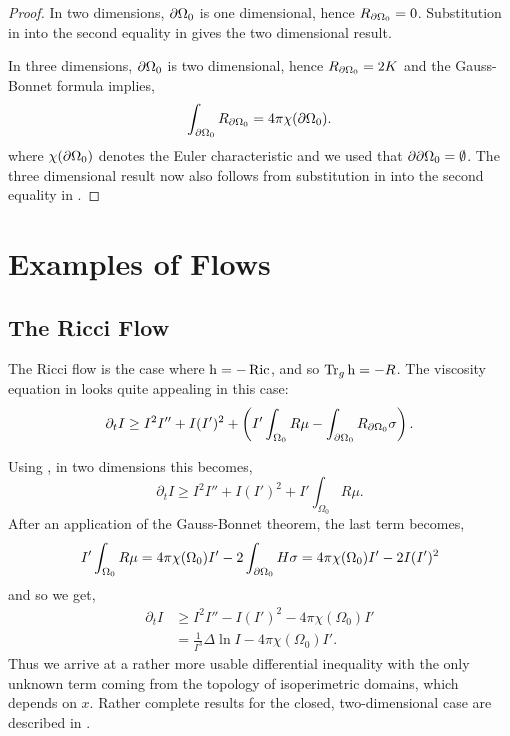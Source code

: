 \documentclass{amsart}
\begin{document}
\begin{proof}
In two dimensions, \(\partial {\Omega_0}\) is one dimensional, hence \(R_{\partial {\Omega_0}} = 0\). Substitution in into the second equality in  gives the two dimensional result.

In three dimensions, \(\partial {\Omega_0}\) is two dimensional, hence \(R_{\partial {\Omega_0}} = 2K\) and the Gauss-Bonnet formula implies,
\[
\int_{\partial {\Omega_0}} R_{\partial {\Omega_0}} = 4\pi \chi(\partial {\Omega_0}).
\]
where \(\chi(\partial {\Omega_0})\) denotes the Euler characteristic and we used that \(\partial {\partial {\Omega_0}} = \emptyset\). The three dimensional result now also follows from substitution in into the second equality in .
\end{proof}

\section{Examples of Flows}
\label{sec:flows}

\subsection{The Ricci Flow}
\label{subsec:flows_ricci}

The Ricci flow is the case where $\operatorname{h} = -\operatorname{Ric}$, and so $\operatorname{Tr}_g \operatorname{h} = -R$. The viscosity equation in  looks quite appealing in this case:
\begin{equation}
\label{eq:viscosity_ricciflow}
\partial_t I \geq I^2I'' + I(I')^2 + \left(I'\int_{\Omega_0} R \mu - \int_{\partial {\Omega_0}} R_{\partial {\Omega_0}}\sigma \right).
\end{equation}

Using , in two dimensions this becomes,
\[
\partial_t I \geq I^2I'' + I(I')^2 + I'\int_{\Omega_0} R \mu.
\]
After an application of the Gauss-Bonnet theorem, the last term becomes,
\[
I'\int_{\Omega_0} R \mu = 4\pi\chi(\Omega_0)I' - 2\int_{\partial {\Omega_0}} H \sigma = 4\pi\chi(\Omega_0)I'- 2 I (I')^2
\]
and so we get,
\begin{equation}
\label{eq:2d_viscosity_ricciflow}
\begin{split}
\partial_t I &\geq I^2I'' - I(I')^2 - 4\pi\chi(\Omega_0)I' \\
&= \frac{1}{I^3} \Delta \ln I - 4\pi\chi(\Omega_0)I'.
\end{split}
\end{equation}
Thus we arrive at a rather more usable differential inequality with the only unknown term coming from the topology of isoperimetric domains, which depends on \(x\). Rather complete results for the closed, two-dimensional case are described in \cite{Bryan:/2016,AndrewsBryan:/2010}.
\end{document}
